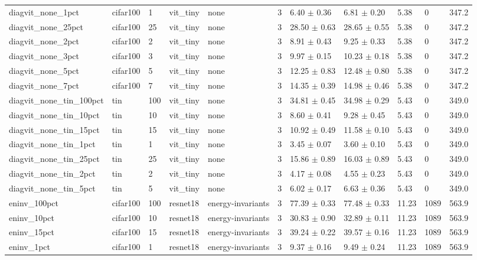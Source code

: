 \begin{tabular}{lllllllllll}
diagvit_none_1pct & cifar100 & 1 & vit_tiny & none & 3 & 6.40 $\pm$ 0.36 & 6.81 $\pm$ 0.20 & 5.38 & 0 & 347.2 \\
diagvit_none_25pct & cifar100 & 25 & vit_tiny & none & 3 & 28.50 $\pm$ 0.63 & 28.65 $\pm$ 0.55 & 5.38 & 0 & 347.2 \\
diagvit_none_2pct & cifar100 & 2 & vit_tiny & none & 3 & 8.91 $\pm$ 0.43 & 9.25 $\pm$ 0.33 & 5.38 & 0 & 347.2 \\
diagvit_none_3pct & cifar100 & 3 & vit_tiny & none & 3 & 9.97 $\pm$ 0.15 & 10.23 $\pm$ 0.18 & 5.38 & 0 & 347.2 \\
diagvit_none_5pct & cifar100 & 5 & vit_tiny & none & 3 & 12.25 $\pm$ 0.83 & 12.48 $\pm$ 0.80 & 5.38 & 0 & 347.2 \\
diagvit_none_7pct & cifar100 & 7 & vit_tiny & none & 3 & 14.35 $\pm$ 0.39 & 14.98 $\pm$ 0.46 & 5.38 & 0 & 347.2 \\
diagvit_none_tin_100pct & tin & 100 & vit_tiny & none & 3 & 34.81 $\pm$ 0.45 & 34.98 $\pm$ 0.29 & 5.43 & 0 & 349.0 \\
diagvit_none_tin_10pct & tin & 10 & vit_tiny & none & 3 & 8.60 $\pm$ 0.41 & 9.28 $\pm$ 0.45 & 5.43 & 0 & 349.0 \\
diagvit_none_tin_15pct & tin & 15 & vit_tiny & none & 3 & 10.92 $\pm$ 0.49 & 11.58 $\pm$ 0.10 & 5.43 & 0 & 349.0 \\
diagvit_none_tin_1pct & tin & 1 & vit_tiny & none & 3 & 3.45 $\pm$ 0.07 & 3.60 $\pm$ 0.10 & 5.43 & 0 & 349.0 \\
diagvit_none_tin_25pct & tin & 25 & vit_tiny & none & 3 & 15.86 $\pm$ 0.89 & 16.03 $\pm$ 0.89 & 5.43 & 0 & 349.0 \\
diagvit_none_tin_2pct & tin & 2 & vit_tiny & none & 3 & 4.17 $\pm$ 0.08 & 4.55 $\pm$ 0.23 & 5.43 & 0 & 349.0 \\
diagvit_none_tin_5pct & tin & 5 & vit_tiny & none & 3 & 6.02 $\pm$ 0.17 & 6.63 $\pm$ 0.36 & 5.43 & 0 & 349.0 \\
eninv_100pct & cifar100 & 100 & resnet18 & energy-invariants & 3 & 77.39 $\pm$ 0.33 & 77.48 $\pm$ 0.33 & 11.23 & 1089 & 563.9 \\
eninv_10pct & cifar100 & 10 & resnet18 & energy-invariants & 3 & 30.83 $\pm$ 0.90 & 32.89 $\pm$ 0.11 & 11.23 & 1089 & 563.9 \\
eninv_15pct & cifar100 & 15 & resnet18 & energy-invariants & 3 & 39.24 $\pm$ 0.22 & 39.57 $\pm$ 0.16 & 11.23 & 1089 & 563.9 \\
eninv_1pct & cifar100 & 1 & resnet18 & energy-invariants & 3 & 9.37 $\pm$ 0.16 & 9.49 $\pm$ 0.24 & 11.23 & 1089 & 563.9 \\

\end{tabular}
